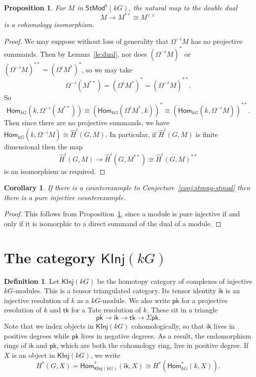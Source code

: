 \documentclass[12pt]{amsart}
\newcommand{\Hom}{\mathsf{Hom}}
\newcommand{\ik}{\mathsf{ik}}
\newcommand{\kG}{\kk G}
\newcommand{\kk}{k}
\newcommand{\KInj}{\mathsf{KInj}}
\newcommand{\pk}{\mathsf{pk}}
\newcommand{\StMod}{\mathsf{StMod}}
\newcommand{\tk}{\mathsf{tk}}
\numberwithin{equation}{section}
\theoremstyle{plain}
\newtheorem{proposition}[equation]{Proposition}
\newtheorem{corollary}[equation]{Corollary}
\theoremstyle{definition}
\newtheorem{definition}[equation]{Definition}
\theoremstyle{remark}
\begin{document}
\begin{proposition}\label{pr:double-dual}
For $M$ in $\StMod^b(\kG)$, the natural map to the double dual 
\[ M \to M^{**} \cong M^{\vee\vee} \] 
is a cohomology isomorphism.
\end{proposition}
\begin{proof}
We may suppose without loss of generality that $\Omega^{-i}M$ has no projective
summands. Then by Lemma~\ref{le:dual}, nor does $(\Omega^{-i}M)^*$ or
$(\Omega^{-i}M)^{**}=(\Omega^iM^*)^*$, so we may take
\[ \Omega^{-i}(M^{**})=(\Omega^iM^*)^*=(\Omega^{-i}M)^{**}. \] 
So 
\[ \Hom_{\kG}(\kk,\Omega^{-i}(M^{**})) \cong (\Hom_{\kG}(\Omega^iM^*,k))^*
\cong (\Hom_{\kG}(k,\Omega^{-i}M))^{**}. \]
Then since there are no projective summands, we have 
$\Hom_{\kG}(k,\Omega^{-i}M) \cong \hat H^i(G,M)$. In particular,
if $\hat H^i(G,M)$ is finite dimensional then the map 
\[ \hat H^i(G,M)\to \hat H^i(G,M^{**})\cong \hat H^i(G,M)^{**} \] 
is an isomorphism as required.
\end{proof}

\begin{corollary}
If there is a counterexample to Conjecture~\ref{conj:strong-stmod} then there is a pure
injective counterexample.
\end{corollary}
\begin{proof}
This follows from Proposition~\ref{pr:double-dual}, 
since a module is pure injective if
and only if it is isomorphic to a direct summand of the dual of a module.
\end{proof}

\section{\texorpdfstring{The category $\KInj(\kG)$}
{The category KInj(kG)}}

\begin{definition}
Let $\KInj(\kG)$ be the homotopy category of complexes of injective
 $\kG$-modules. This is a tensor triangulated category. Its tensor
identity $\ik$ is an injective resolution of $\kk$ as a $\kG$-module.
We also write $\pk$ for a projective resolution of $\kk$ and $\tk$ for
a Tate resolution of $\kk$. These sit in a triangle
\[ \pk \to \ik \to \tk \to \Sigma\pk. \]
Note that we index objects in $\KInj(\kG)$ cohomologically, so that
$\ik$ lives in positive degrees while $\pk$ lives in negative
degrees. As a result, the endomorphism rings of $\ik$ and $\pk$, which
are both the cohomology ring, live in positive
degree. 
If $X$ is an object in $\KInj(\kG)$, we write 
\[ H^*(G,X) =
  \Hom^*_{\KInj(\kG)}(\ik,X)\cong H^*(\Hom^*_{\kG}(\kk,X)). \]
\end{definition}
\end{document}
